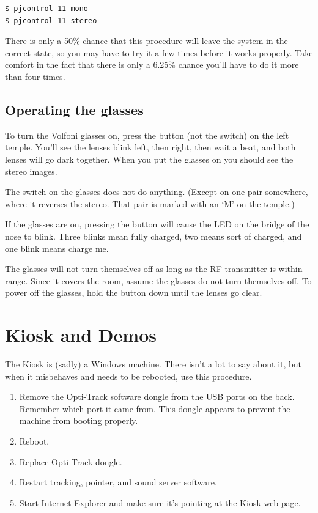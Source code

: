 \documentclass[11pt]{article}
\begin{document}
\begin{verbatim}
$ pjcontrol 11 mono
$ pjcontrol 11 stereo
\end{verbatim}

There is only a 50\% chance that this procedure will leave the system
in the correct state, so you may have to try it a few times before it
works properly.  Take comfort in the fact that there is only a 6.25\%
chance you'll have to do it more than four times.

\fi

\subsection{Operating the glasses}

To turn the Volfoni glasses on, press the button (not the switch) on
the left temple.  You'll see the lenses blink left, then right, then
wait a beat, and both lenses will go dark together.  When you put the
glasses on you should see the stereo images.

The switch on the glasses does not do
anything.  (Except on one pair somewhere, where it reverses the
stereo.  That pair is marked with an `M' on the temple.)

If the glasses are on, pressing the button will cause the LED on the
bridge of the nose to blink.  Three blinks mean fully charged, two
means sort of charged, and one blink means charge me.

The glasses will not turn themselves off as long as the RF transmitter
is within range.  Since it covers the room, assume the glasses do not
turn themselves off.  To power off the glasses, hold the button down
until the lenses go clear.

\section{Kiosk and Demos}

The Kiosk is (sadly) a Windows machine.  There isn't a lot to say
about it, but when it misbehaves and needs to be rebooted, use this
procedure.

\begin{enumerate}
\item Remove the Opti-Track software dongle from the USB ports on the
  back.  Remember which port it came from.  This dongle appears to
  prevent the machine from booting properly.

\item Reboot.

\item Replace Opti-Track dongle.

\item Restart tracking, pointer, and sound server software.

\item Start Internet Explorer and make sure it's pointing at the Kiosk
  web page.

\end{enumerate}
\end{document}
